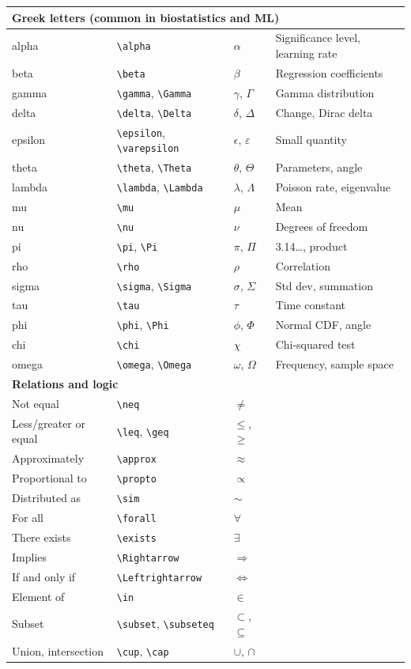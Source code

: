 \begin{longtable}{p{3.2cm} p{4.5cm} p{3.0cm} p{3.5cm}}
\multicolumn{4}{l}{\textbf{Greek letters (common in biostatistics and ML)}} \\
\midrule
alpha & \verb|\alpha| & $\alpha$ & Significance level, learning rate \\
beta & \verb|\beta| & $\beta$ & Regression coefficients \\
gamma & \verb|\gamma|, \verb|\Gamma| & $\gamma$, $\Gamma$ & Gamma distribution \\
delta & \verb|\delta|, \verb|\Delta| & $\delta$, $\Delta$ & Change, Dirac delta \\
epsilon & \verb|\epsilon|, \verb|\varepsilon| & $\epsilon$, $\varepsilon$ & Small quantity \\
theta & \verb|\theta|, \verb|\Theta| & $\theta$, $\Theta$ & Parameters, angle \\
lambda & \verb|\lambda|, \verb|\Lambda| & $\lambda$, $\Lambda$ & Poisson rate, eigenvalue \\
mu & \verb|\mu| & $\mu$ & Mean \\
nu & \verb|\nu| & $\nu$ & Degrees of freedom \\
pi & \verb|\pi|, \verb|\Pi| & $\pi$, $\Pi$ & 3.14\ldots, product \\
rho & \verb|\rho| & $\rho$ & Correlation \\
sigma & \verb|\sigma|, \verb|\Sigma| & $\sigma$, $\Sigma$ & Std dev, summation \\
tau & \verb|\tau| & $\tau$ & Time constant \\
phi & \verb|\phi|, \verb|\Phi| & $\phi$, $\Phi$ & Normal CDF, angle \\
chi & \verb|\chi| & $\chi$ & Chi-squared test \\
omega & \verb|\omega|, \verb|\Omega| & $\omega$, $\Omega$ & Frequency, sample space \\
\midrule

\multicolumn{4}{l}{\textbf{Relations and logic}} \\
\midrule
Not equal & \verb|\neq| & $\neq$ & \\
Less/greater or equal & \verb|\leq|, \verb|\geq| & $\leq$, $\geq$ & \\
Approximately & \verb|\approx| & $\approx$ & \\
Proportional to & \verb|\propto| & $\propto$ & \\
Distributed as & \verb|\sim| & $\sim$ & \\
For all & \verb|\forall| & $\forall$ & \\
There exists & \verb|\exists| & $\exists$ & \\
Implies & \verb|\Rightarrow| & $\Rightarrow$ & \\
If and only if & \verb|\Leftrightarrow| & $\Leftrightarrow$ & \\
Element of & \verb|\in| & $\in$ & \\
Subset & \verb|\subset|, \verb|\subseteq| & $\subset$, $\subseteq$ & \\
Union, intersection & \verb|\cup|, \verb|\cap| & $\cup$, $\cap$ & \\
\midrule


\end{longtable}
